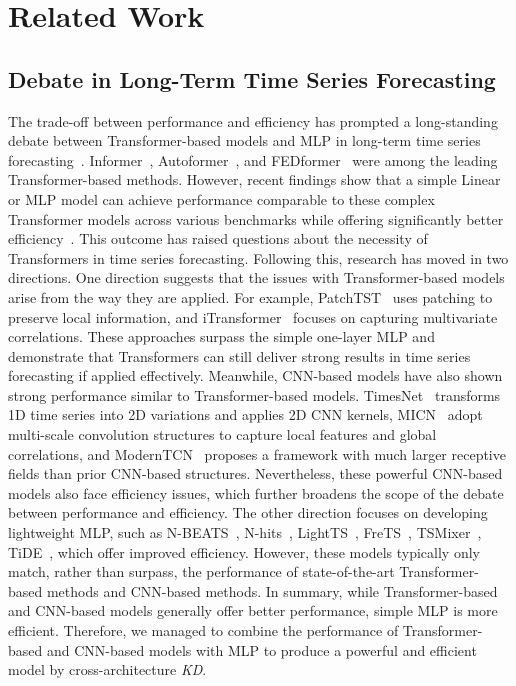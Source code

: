\section{Related Work}
\label{app:related_work}
\subsection{Debate in Long-Term Time Series Forecasting}
The trade-off between performance and efficiency has prompted a long-standing debate between Transformer-based models and MLP in long-term time series forecasting~\cite{dlinear, lightts, sparsetsf}. Informer~\cite{informer}, Autoformer~\cite{autoformer}, and FEDformer~\cite{fedformer} were among the leading Transformer-based methods. However, recent findings show that a simple Linear or MLP model can achieve performance comparable to these complex Transformer models across various benchmarks while offering significantly better efficiency~\cite{dlinear}. This outcome has raised questions about the necessity of Transformers in time series forecasting. Following this, research has moved in two directions. One direction suggests that the issues with Transformer-based models arise from the way they are applied.  For example, PatchTST~\cite{patchtst} uses patching to preserve local information, and iTransformer~\cite{itransformer} focuses on capturing multivariate correlations. These approaches surpass the simple one-layer MLP and demonstrate that Transformers can still deliver strong results in time series forecasting if applied effectively. Meanwhile, CNN-based models have also shown strong performance similar to Transformer-based models. TimesNet~\cite{timesnet} transforms 1D time series into 2D variations and applies 2D CNN kernels, MICN~\cite{micn} adopt multi-scale convolution structures to capture local features and global correlations, and ModernTCN~\cite{moderntcn} proposes a framework with much larger receptive fields than prior CNN-based structures. Nevertheless, these powerful CNN-based models also face efficiency issues, which further broadens the scope of the debate between performance and efficiency. The other direction focuses on developing lightweight MLP, such as N-BEATS~\cite{nbeats}, N-hits~\cite{nhits}, LightTS~\cite{lightts}, FreTS~\cite{frets}, TSMixer~\cite{tsmixer}, TiDE~\cite{tide}, which offer improved efficiency. However, these models typically only match, rather than surpass, the performance of state-of-the-art Transformer-based methods and CNN-based methods. In summary, while Transformer-based and CNN-based models generally offer better performance, simple MLP is more efficient. Therefore, we managed to combine the performance of Transformer-based and CNN-based models with MLP to produce a powerful and efficient model by cross-architecture \textit{KD}.


